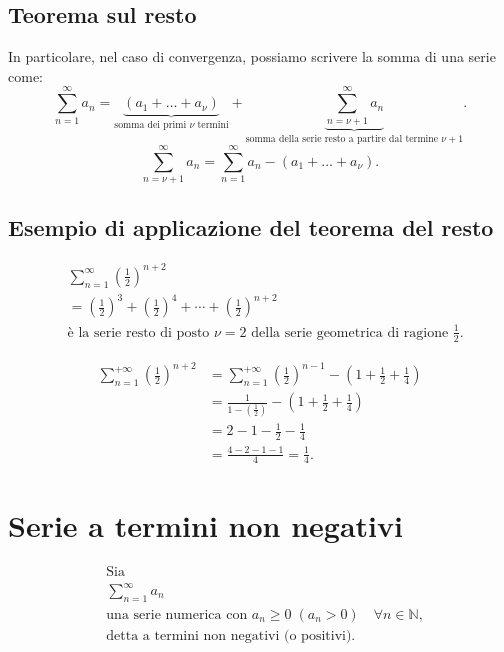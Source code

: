 \documentclass{article}
\begin{document}
\subsection*{Teorema sul resto}

In particolare, nel caso di convergenza, possiamo scrivere la somma di una serie come:
\[
\sum_{n=1}^{\infty} a_n = \underbrace{\left(a_1 + \dots + a_\nu\right)}_{\text{somma dei primi $\nu$ termini}} + \underbrace{\sum_{n=\nu+1}^{\infty} a_n}_{\text{somma della serie resto a partire dal termine $\nu+1$}}.
\]
\[
\sum_{n=\nu+1}^{\infty} a_n = \sum_{n=1}^{\infty} a_n - \left( a_1 + \dots + a_\nu \right).
\]

\subsection*{Esempio di applicazione del teorema del resto}

\begin{align*}
    &\sum_{n=1}^{\infty} \left( \frac{1}{2} \right)^{n+2} \\
    &= \left( \frac{1}{2} \right)^3 + \left( \frac{1}{2} \right)^4 + \cdots + \left( \frac{1}{2} \right)^{n+2} \\
    &\text{è la serie resto di posto } \nu = 2 \text{ della serie geometrica di ragione } \frac{1}{2}.
\end{align*}

\begin{align*}
    \sum_{n=1}^{+\infty} \left( \frac{1}{2} \right)^{n+2} &= \sum_{n=1}^{+\infty} \left( \frac{1}{2} \right)^{n-1} - \left( 1 + \frac{1}{2} + \frac{1}{4} \right) \\
    &= \frac{1}{1 - \left( \frac{1}{2} \right)} - \left( 1 + \frac{1}{2} + \frac{1}{4} \right) \\
    &= 2 - 1 - \frac{1}{2} - \frac{1}{4} \\
    &= \frac{4 - 2 - 1 - 1}{4} = \frac{1}{4}.
\end{align*}

\section*{Serie a termini non negativi}
\begin{align*}
    &\text{Sia} \\
    &\sum_{n=1}^{\infty} a_n \\
    &\text{una serie numerica con $a_n \geq 0 \; (a_n > 0)$} \quad \forall n \in \mathbb{N}, \\
    &\text{detta a termini non negativi (o positivi).}
\end{align*}
\end{document}
